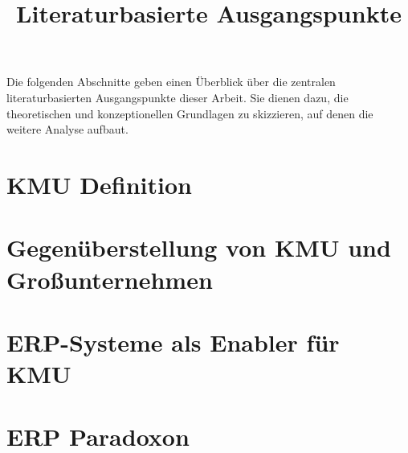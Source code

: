 \title{Literaturbasierte Ausgangspunkte}
\label{sec:ausgangspunkte}

Die folgenden Abschnitte geben einen Überblick über die zentralen literaturbasierten Ausgangspunkte dieser Arbeit. 
Sie dienen dazu, die theoretischen und konzeptionellen Grundlagen zu skizzieren, auf denen die weitere Analyse aufbaut.

\section{KMU Definition}
\label{sec:kmu_definition}


\section{Gegenüberstellung von KMU und Großunternehmen}
\label{sec:gegenueberstellung}


%

\section{ERP-Systeme als Enabler für KMU}
\label{sec:erp-als-enabler}


\section{ERP Paradoxon}
\label{sec:erp-paradoxon}


